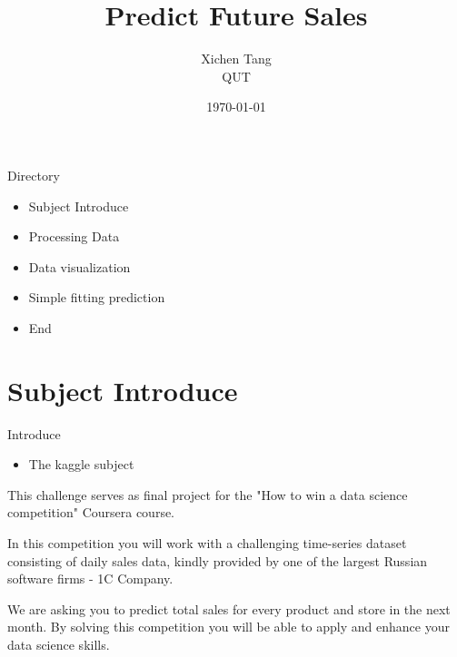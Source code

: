 \documentclass[
 size=12pt,
 paper=smartboard, %
 mode=present, %
 display=slides, %
style=tuliplab,
pauseslide,
fleqn,leqno]{powerdot}
\title{Predict Future Sales}
\author{
Xichen Tang
\\
QUT
}
\date{\today}
\begin{document}
\maketitle

\begin{slide}[toc=,bm=]{Directory}
\tableofcontents[content=sections]
	\begin{itemize}
    \item Subject Introduce
    \item Processing Data
    \item Data visualization
    \item Simple fitting prediction
    \item End
    \end{itemize}
\end{slide}

\section{Subject Introduce}

\begin{slide}{Introduce}

  \begin{itemize}
    \item The kaggle subject
    \end{itemize}
     This challenge serves as final project for the "How to win a data science competition" Coursera course.\par

     In this competition you will work with a challenging time-series dataset consisting of daily sales data, kindly provided by one of the largest Russian software firms - 1C Company.\par

     We are asking you to predict total sales for every product and store in the next month. By solving this competition you will be able to apply and enhance your data science skills.
\end{slide}
\end{document}
